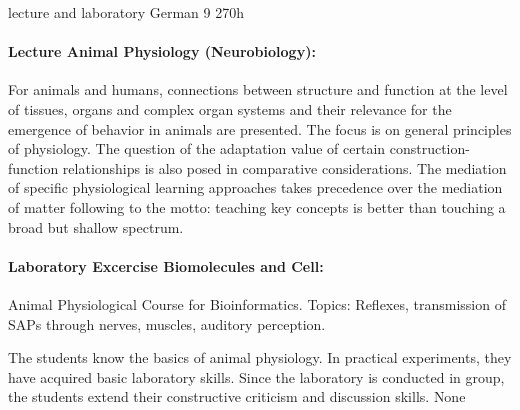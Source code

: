 {lecture and laboratory}
{German}
{9}
{270h}
{\paragraph{Lecture Animal Physiology (Neurobiology):} For animals and humans, connections between structure and function at the level of tissues, organs and complex organ systems and their relevance for the emergence of behavior in animals are presented. The focus is on general principles of physiology. The question of the adaptation value of certain construction-function relationships is also posed in comparative considerations. The mediation of specific physiological learning approaches takes precedence over the mediation of matter following to the motto: teaching key concepts is better than touching a broad but shallow spectrum.
\paragraph{Laboratory Excercise Biomolecules and Cell:}  Animal Physiological Course for Bioinformatics. Topics: Reflexes, transmission of SAPs through nerves, muscles, auditory perception. }
{The students know the basics of animal physiology. In practical experiments, they have acquired basic laboratory skills. Since the laboratory is conducted in group, the students extend their constructive criticism and discussion skills.}
{None}